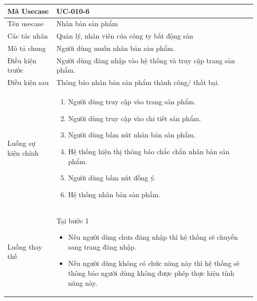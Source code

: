 \documentclass[12pt,a4paper]{article}
\begin{document}
    \begin{table}[H]
        \centering
        \begin{tabular}{|p{3.5cm}|p{11.5cm}|c|}
            \hline
            Mã Usecase      & UC-010-6                                                      \\
            \hline
            Tên usecase     & Nhân bản sản phẩm                                             \\
            \hline
            Các tác nhân    & Quản lý, nhân viên của công ty bất động sản                   \\
            \hline
            Mô tả chung     & Người dùng muốn nhân bản sản phẩm.                            \\
            \hline

            Điều kiện trước & Người dùng đăng nhập vào hệ thống và truy cập trang sản phẩm. \\
            \hline

            Điều kiện sau   & Thông báo nhân bản sản phẩm thành công/ thất bại.             \\
            \hline

            Luồng sự kiện chính & \vspace{-.8cm}\begin{enumerate}
                                                    \item Người dùng truy cập vào trang sản phẩm.
                                                    \item Người dùng truy cập vào chi tiết sản phẩm.
                                                    \item  Người dùng bấm nút nhân bản sản phẩm.
                                                    \item  Hệ thống hiện thị thông báo chắc chắn nhân bản sản phẩm.
                                                    \item  Người dùng bấm nút đồng ý.
                                                    \item Hệ thống nhân bản sản phẩm.
            \end{enumerate}
            \\
            \hline
            Luồng thay thế & Tại bước 1\newline
            \vspace{-.8cm}\begin{itemize}
                              \item Nếu người dùng chưa đăng nhập thì hệ thống sẽ chuyển sang trang đăng nhập.
                              \item Nếu người dùng không có chức năng này thì hệ thống sẽ thông báo người dùng không được phép thực hiện tính năng này.
            \end{itemize}


\end{tabular}
\end{table}
\end{document}
